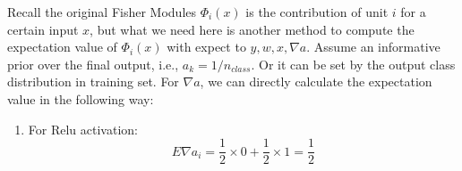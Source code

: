 \documentclass{sig-alternate}
\begin{document}
    Recall the original Fisher Modules $\Phi_i(x)$ is the contribution of unit $i$ for a certain input $x$, but what we need here is another method to compute the expectation value of $\Phi_i(x)$ with expect to $y, w, x, \nabla a$. Assume an informative prior over the final output, i.e., $a_k = 1/n_{class}$. Or it can be set by the output class distribution in training set. For $\nabla a$, we can directly calculate the expectation value in the following way:
    \begin{enumerate}
        \item For Relu activation:
            \begin{equation}
            E\nabla a_i = \frac{1}{2} \times 0 + \frac{1}{2} \times 1 = \frac{1}{2}
            \end{equation}
        

\end{enumerate}
\end{document}
